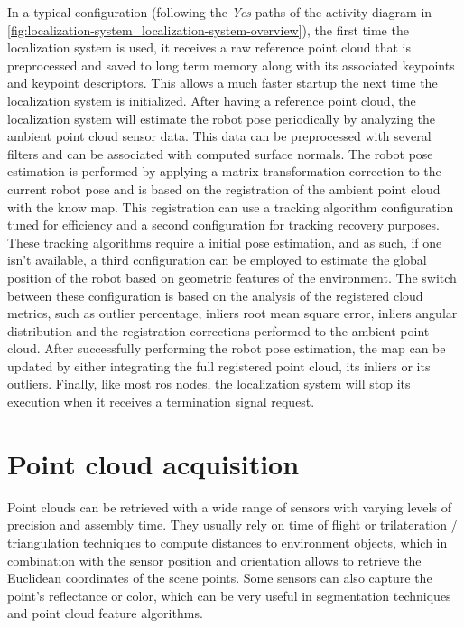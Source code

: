 In a typical configuration (following the \emph{Yes} paths of the activity diagram in \cref{fig:localization-system_localization-system-overview}), the first time the localization system is used, it receives a raw reference point cloud that is preprocessed and saved to long term memory along with its associated keypoints and keypoint descriptors. This allows a much faster startup the next time the localization system is initialized. After having a reference point cloud, the localization system will estimate the robot pose periodically by analyzing the ambient point cloud sensor data. This data can be preprocessed with several filters and can be associated with computed surface normals. The robot pose estimation is performed by applying a matrix transformation correction to the current robot pose and is based on the registration of the ambient point cloud with the know map. This registration can use a tracking algorithm configuration tuned for efficiency and a second configuration for tracking recovery purposes. These tracking algorithms require a initial pose estimation, and as such, if one isn't available, a third configuration can be employed to estimate the global position of the robot based on geometric features of the environment. The switch between these configuration is based on the analysis of the registered cloud metrics, such as outlier percentage, inliers root mean square error, inliers angular distribution and the registration corrections performed to the ambient point cloud. After successfully performing the robot pose estimation, the map can be updated by either integrating the full registered point cloud, its inliers or its outliers. Finally, like most \gls{ros} nodes, the localization system will stop its execution when it receives a termination signal request.



\section{Point cloud acquisition}

Point clouds can be retrieved with a wide range of sensors with varying levels of precision and assembly time. They usually rely on time of flight or trilateration / triangulation techniques to compute distances to environment objects, which in combination with the sensor position and orientation allows to retrieve the Euclidean coordinates of the scene points. Some sensors can also capture the point's reflectance or color, which can be very useful in segmentation techniques and point cloud feature algorithms.



